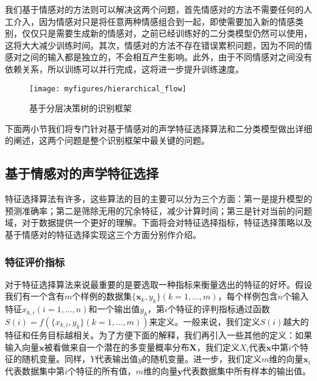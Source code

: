 我们基于情感对的方法则可以解决这两个问题，首先情感对的方法不需要任何的人工介入，因为情感对只是将任意两种情感组合到一起，即使需要加入新的情感类别，仅仅只是需要生成新的情感对，之前已经训练好的二分类模型仍然可以使用，这将大大减少训练时间。其次，情感对的方法不存在错误累积问题，因为不同的情感对之间的输入都是独立的，不会相互产生影响。此外，由于不同情感对之间没有依赖关系，所以训练可以并行完成，这将进一步提升训练速度。

\begin{figure}[htb] %
    \centering
    \texttt{[image: myfigures/hierarchical\_flow]}
    \caption{基于分层决策树的识别框架}
    \label{fig:hierarchical_flow}
\end{figure}

下面两小节我们将专门针对基于情感对的声学特征选择算法和二分类模型做出详细的阐述，这两个问题是整个识别框架中最关键的问题。

\subsection{基于情感对的声学特征选择}
\label{ssec:emo_pair_feature_select}
特征选择算法有许多，这些算法的目的主要可以分为三个方面：第一是提升模型的预测准确率；第二是筛除无用的冗余特征，减少计算时间；第三是针对当前的问题域，对于数据提供一个更好的理解。下面将会对特征选择指标，特征选择策略以及基于情感对的特征选择实现这三个方面分别作介绍。

\subsubsection{特征评价指标}
\label{sssec:feature_select_metrics}
对于特征选择算法来说最重要的是要选取一种指标来衡量选出的特征的好坏。假设我们有一个含有$m$个样例的数据集$\{\mathbf{x}_k, y_k\}(k=1,...,m)$，每个样例包含$n$个输入特征$x_{k,i}(i=1,...,n)$和一个输出值$y_k$，第$i$个特征的评判指标通过函数$S(i)=f(\{x_{k,i}, y_k\}(k=1,...,m))$来定义。一般来说，我们定义$S(i)$越大的特征和任务目标越相关。为了方便下面的解释，我们再引入一些其他的定义：如果输入向量$\mathbf{x}$被看做来自一个潜在的多变量概率分布$\mathbf{X}$，我们定义$X_i$代表$\mathbf{x}$中第$i$个特征的随机变量。同样，$Y$代表输出值$y$的随机变量。进一步，我们定义$m$维的向量$\mathbf{x}_i$代表数据集中第$i$个特征的所有值，$m$维的向量$\mathbf{y}$代表数据集中所有样本的输出值。

